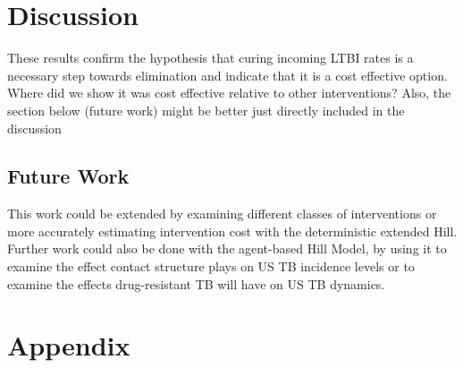 \documentclass{amsart}
\begin{document}
\section{Discussion}
These results confirm the hypothesis that curing incoming LTBI rates is a
necessary step towards elimination and indicate that it is a cost effective
option. \\
{\huge \color{red} Where did we show it was cost effective relative to other
interventions? Also, the section below (future work) might be better just
directly included in the discussion}\\
\subsection{Future Work}
This work could be extended by examining different classes of interventions or
more accurately estimating intervention cost with the deterministic extended
Hill. Further work could also be done with the agent-based Hill Model, by using
it to examine the effect contact structure plays on US TB incidence levels or to
examine the effects drug-resistant TB will have on US TB dynamics. 

\section{Appendix}
\end{document}
